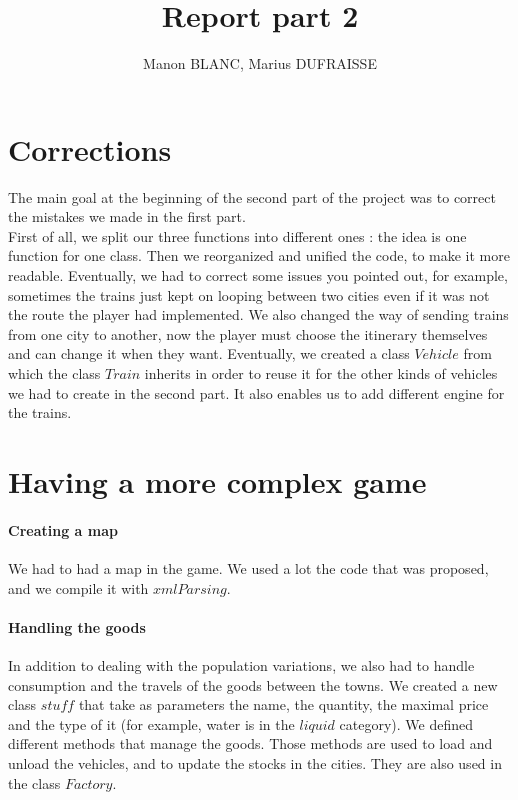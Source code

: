 \documentclass[a4paper]{article}
\title{Report part 2}
\author{Manon BLANC, Marius DUFRAISSE}
\date{  }
\begin{document}
	\maketitle
	\thispagestyle{fancy}
	
	\section{Corrections}
	The main goal at the beginning of the second part of the project was to correct the mistakes we made in the first part.\\
	First of all, we split our three functions into different ones : the idea is one function for one class. Then we reorganized and unified the code, to make it more readable. Eventually, we had to correct some issues you pointed out, for example, sometimes the trains just kept on looping between two cities even if it was not the route the player had implemented. We also changed the way of sending trains from one city to another, now the player must choose the itinerary themselves and can change it when they want. Eventually, we created a class $Vehicle$ from which the class $Train$ inherits in order to reuse it for the other kinds of vehicles we had to create in the second part. It also enables us to add different engine for the trains.
	
	\section{Having a more complex game}
	\paragraph{Creating a map}
	
	We had to had a map in the game. We used a lot the code that was proposed, and we compile it with $xmlParsing$.
	
	\paragraph{Handling the goods}
	
	In addition to dealing with the population variations, we also had to handle consumption and the travels of the goods between the towns. We created a new class $stuff$ that take as parameters the name, the quantity, the maximal price and the type of it (for example, water is in the $liquid$ category). We defined different methods that manage the goods. Those methods are used to load and unload the vehicles, and to update the stocks in the cities. They are also used in the class $Factory$.\\
	
\end{document}
